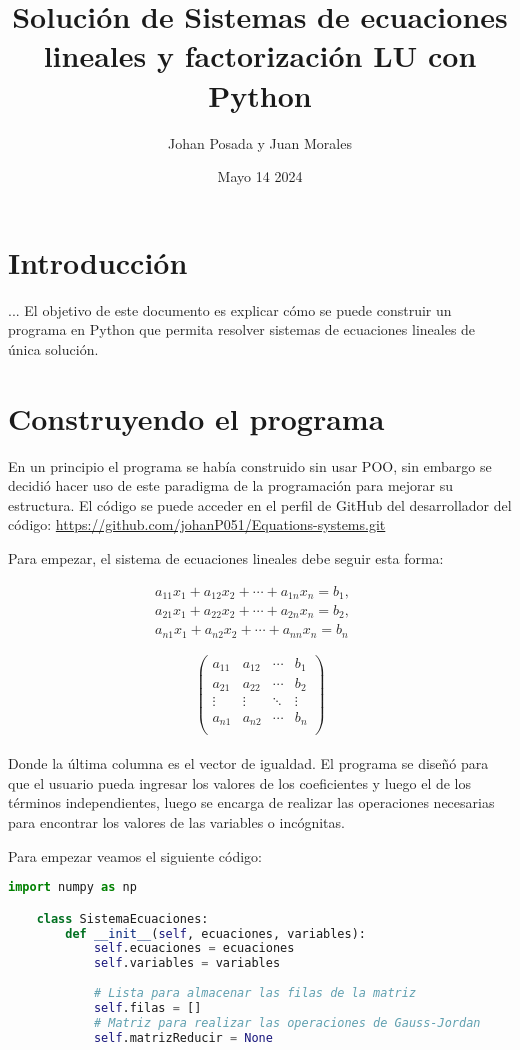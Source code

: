 \documentclass[letterpaper,12pt]{article}
\begin{document}
\title{Solución de Sistemas de ecuaciones lineales y factorización LU con Python}
\author{Johan Posada y Juan Morales}
\date{Mayo 14 2024}
\maketitle

\section{Introducción}
... El objetivo de este documento es explicar cómo se puede construir un programa en Python que permita resolver sistemas de ecuaciones lineales de única solución.
\section{Construyendo el programa}
En un principio el programa se había construido sin usar POO, sin embargo se decidió hacer uso de este paradigma de la programación para
mejorar su estructura. El código se puede acceder en el perfil de GitHub del desarrollador del código: \url{https://github.com/johanP051/Equations-systems.git}

Para empezar, el sistema de ecuaciones lineales debe seguir esta forma:

\begin{align*}
    a_{11}x_1 + a_{12}x_2 + \cdots + a_{1n}x_n = b_1, \quad
    \\
    a_{21}x_1 + a_{22}x_2 + \cdots + a_{2n}x_n = b_2, \quad
    \\
    a_{n1}x_1 + a_{n2}x_2 + \cdots + a_{nn}x_n = b_n
    \end{align*}


\[
\left(
\begin{array}{ccc|c}
a_{11} & a_{12} & \cdots & b_1 \\
a_{21} & a_{22} & \cdots & b_2 \\
\vdots & \vdots & \ddots & \vdots \\
a_{n1} & a_{n2} & \cdots & b_n \\
\end{array}
\right)
\]
\\
Donde la última columna es el vector de igualdad. El programa se diseñó para que el usuario pueda ingresar los valores de los coeficientes y luego el de los términos
independientes, luego se encarga de realizar las operaciones necesarias para encontrar los valores de las variables o incógnitas.


Para empezar veamos el siguiente código:
\\
\begin{lstlisting}[style=jupyter, language=Python, caption={Atributos de la clase}]
    import numpy as np

    class SistemaEcuaciones:
        def __init__(self, ecuaciones, variables):
            self.ecuaciones = ecuaciones
            self.variables = variables
            
            # Lista para almacenar las filas de la matriz
            self.filas = []
            # Matriz para realizar las operaciones de Gauss-Jordan
            self.matrizReducir = None
    \end{lstlisting}
\end{document}

